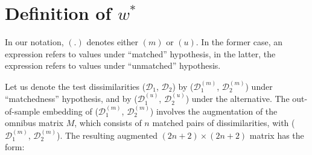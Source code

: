 \documentclass[12pt]{article} %
\newenvironment{remark}[1][Remark]{\begin{trivlist}
\item[\hskip \labelsep {\bfseries #1}]}{\end{trivlist}}
\begin{document}
 

\section{Definition of  $w^{*}$}

\begin{remark}
In our notation, $(.)$  denotes  either $(m)$  or   $(u)$. In the former case, an expression refers to values under  ``matched'' hypothesis, in the latter, the expression refers to values under  ``unmatched''   hypothesis.
\end{remark}
Let us denote the test dissimilarities ($\mathcal{D}_1$, $\mathcal{D}_2$)  by  ($\mathcal{D}_1^{(m)}$, $\mathcal{D}_2^{(m)}$)  under ``matchedness'' hypothesis, and  by ($\mathcal{D}_1^{(u)}$, $\mathcal{D}_2^{(u)}$)  under the alternative. The out-of-sample embedding of ($\mathcal{D}_1^{(m)}$, $\mathcal{D}_2^{(m)}$) involves the  augmentation of  the omnibus matrix $M$, which consists of $n$ matched  pairs of dissimilarities,  with ($\mathcal{D}_1^{(m)}$, $\mathcal{D}_2^{(m)}$). The resulting augmented  $(2n+2)\times (2n+2)$ matrix  has the form:
\end{document}
